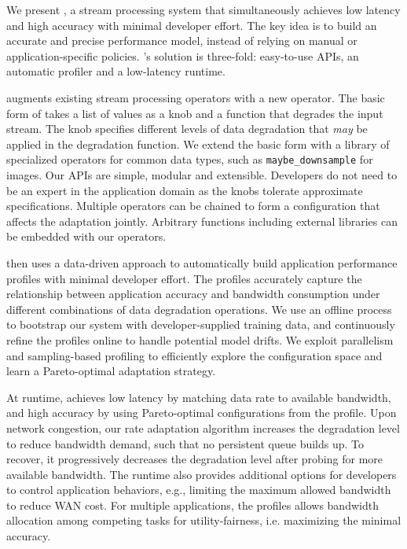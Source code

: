 We present \sysname{}, a stream processing system that
simultaneously achieves low latency and high accuracy with minimal developer
effort. The key idea is to build an accurate and precise performance model,
instead of relying on manual or application-specific policies. \sysname{}'s
solution is three-fold: easy-to-use APIs, an automatic profiler and a
low-latency runtime.

\sysname{} augments existing stream processing operators with a new \maybe{}
operator. The basic form of \maybe{} takes a list of values as a knob and a
function that degrades the input stream. The knob specifies different levels of
data degradation that \textit{may} be applied in the degradation function.  We
extend the basic form with a library of specialized operators for common data
types, such as \texttt{maybe\_downsample} for images. Our APIs are simple,
modular and extensible. Developers do not need to be an expert in the
application domain as the knobs tolerate approximate specifications. Multiple
operators can be chained to form a configuration that affects the adaptation
jointly. Arbitrary functions including external libraries can be embedded with
our operators.

\sysname{} then uses a data-driven approach to automatically build application
performance profiles with minimal developer effort. The profiles accurately
capture the relationship between application accuracy and bandwidth consumption
under different combinations of data degradation operations. We use an offline
process to bootstrap our system with developer-supplied training data, and
continuously refine the profiles online to handle potential model drifts. We
exploit parallelism and sampling-based profiling to efficiently explore the
configuration space and learn a Pareto-optimal adaptation strategy.

At runtime, \sysname{} achieves low latency by matching data rate to available
bandwidth, and high accuracy by using Pareto-optimal configurations from the
profile. Upon network congestion, our rate adaptation algorithm increases the
degradation level to reduce bandwidth demand, such that no persistent queue
builds up. To recover, it progressively decreases the degradation level after
probing for more available bandwidth. The runtime also provides additional
options for developers to control application behaviors, e.g., limiting the
maximum allowed bandwidth to reduce WAN cost. For multiple applications, the
profiles allows bandwidth allocation among competing tasks for utility-fairness,
i.e. maximizing the minimal accuracy.

